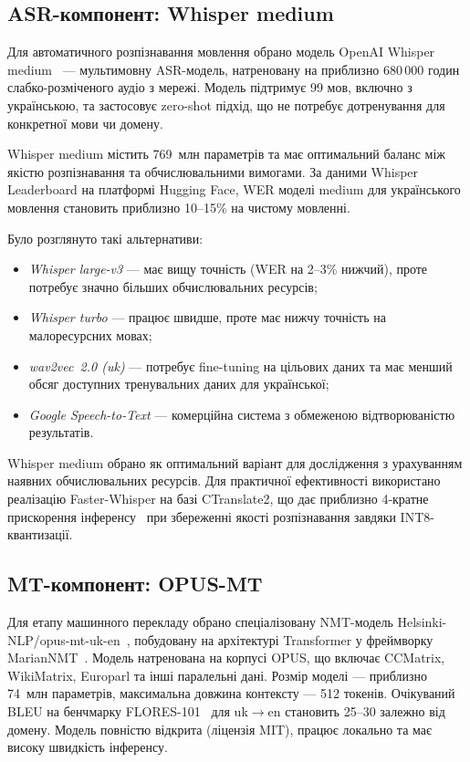 \subsection{ASR-компонент: Whisper medium}

Для автоматичного розпізнавання мовлення обрано модель OpenAI Whisper
medium~\cite{whisper} --- мультимовну ASR-модель, натреновану на
приблизно 680\,000 годин слабко-розміченого аудіо з мережі. Модель
підтримує 99 мов, включно з українською, та застосовує zero-shot підхід,
що не потребує дотренування для конкретної мови чи домену.

Whisper medium містить 769~млн параметрів та має оптимальний
баланс між якістю розпізнавання та обчислювальними вимогами. За даними
Whisper Leaderboard на платформі Hugging Face, WER моделі medium для
українського мовлення становить приблизно 10--15\% на чистому мовленні.

Було розглянуто такі альтернативи:
\begin{itemize}[nosep]
    \item \textit{Whisper large-v3} --- має вищу точність (WER на
    2--3\% нижчий), проте потребує значно більших обчислювальних ресурсів;
    \item \textit{Whisper turbo} --- працює швидше,
    проте має нижчу точність на малоресурсних мовах;
    \item \textit{wav2vec~2.0 (uk)} --- потребує fine-tuning на цільових
    даних та має менший обсяг доступних тренувальних даних для української;
    \item \textit{Google Speech-to-Text} --- комерційна система з
    обмеженою відтворюваністю результатів.
\end{itemize}

Whisper medium обрано як оптимальний варіант для дослідження з урахуванням
наявних обчислювальних ресурсів. Для практичної
ефективності використано реалізацію Faster-Whisper на базі CTranslate2,
що дає приблизно 4-кратне прискорення інференсу~\cite{ctranslate2}
при збереженні якості розпізнавання завдяки INT8-квантизації.

\subsection{MT-компонент: OPUS-MT}

Для етапу машинного перекладу обрано спеціалізовану NMT-модель
Helsinki-NLP/opus-mt-uk-en~\cite{opus_mt}, побудовану на архітектурі
Transformer у фреймворку MarianNMT~\cite{marian_nmt}. Модель натренована
на корпусі OPUS, що включає CCMatrix, WikiMatrix, Europarl та інші
паралельні дані. Розмір моделі --- приблизно 74~млн параметрів, максимальна
довжина контексту --- 512 токенів. Очікуваний BLEU на бенчмарку
FLORES-101~\cite{flores} для uk$\to$en становить 25--30 залежно від домену.
Модель повністю відкрита (ліцензія MIT), працює локально та має
високу швидкість інференсу.

